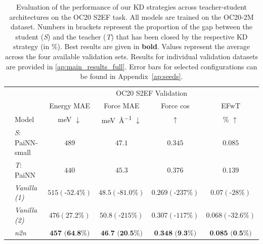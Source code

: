 \begin{table}[h]
\centering
\caption{Evaluation of the performance of our KD strategies across teacher-student architectures on the OC20 S2EF task. All models are trained on the OC20-2M dataset. Numbers in brackets represent the proportion of the gap between the student (\emph{S}) and the teacher (\emph{T}) that has been closed by the respective KD strategy (in \%). Best results are given in \textbf{bold}. Values represent the average across the four available validation sets. Results for individual validation datasets are provided in \cref{ap:main_results_full}. Error bars for selected configurations can be found in Appendix~\ref{ap:seeds}.}
\begin{tabular}{llcccc}
\cmidrule(r){1-6}
\multicolumn{1}{c}{\multirow{3}{*}{}}  & & \multicolumn{4}{c}{OC20 S2EF Validation} 
\\\cmidrule(r){3-6}
\multicolumn{1}{c}{}   &                      &      Energy MAE  &    Force MAE  & Force cos & EFwT \\
&   \multicolumn{1}{l}{Model}             &      \si{\milli\electronvolt} $\downarrow$   &    \si{\milli\electronvolt\per\angstrom} $\downarrow$     & $\uparrow$  & \% $\uparrow$ \\ %
\cmidrule(r){1-6} \morecmidrules\cmidrule(r){1-6}
\parbox[t]{2mm}{} 
& \emph{S}: PaiNN-small                 &              $489$      &     $47.1$     &  $0.345$ &  $0.085$  \\
& \emph{T}: PaiNN                &          $440$        &   $45.3$     &   $0.376$      &   $0.139$  \\
& \emph{Vanilla (1)}            &            $515 (\text{-}52.4\%)$          &          $48.5 (\text{-}81.0\%)$     &     $0.269 (\text{-}237\%)$        &  $0.07 (\text{-}28\%)$   \\
& \emph{Vanilla (2)}            &                $476 (27.2\%)$      &          $50.8 (\text{-}215\%)$     &     $0.307 (\text{-}117\%)$        &   $0.068 (\text{-}32.6\%)$ \\
& \emph{n2n}                 &             $\textbf{457 (64.8\%)}$         &          $\textbf{46.7 (20.5\%)}$     &     $\textbf{0.348 (9.3\%)}$        & $\textbf{0.085 (0.5\%)}$    \\

\end{tabular}
\end{table}
